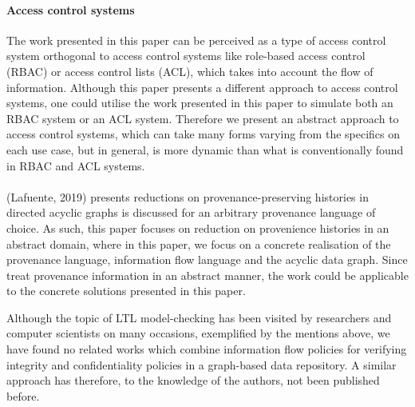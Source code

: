 \paragraph{Access control systems}
The work presented in this paper can be perceived as a type of access control system orthogonal to access control systems like role-based access control (RBAC) or access control lists (ACL), which takes into account the flow of information. Although this paper presents a different approach to access control systems, one could utilise the work presented in this paper to simulate both an RBAC system or an ACL system. Therefore we present an abstract approach to access control systems, which can take many forms varying from the specifics on each use case, but in general, is more dynamic than what is conventionally found in RBAC and ACL systems.

\paragraph{}
(Lafuente, 2019)\cite{lafuente2019framework} presents reductions on provenance-preserving histories in directed acyclic graphs is discussed for an arbitrary provenance language of choice. As such, this paper focuses on reduction on provenience histories in an abstract domain, where in this paper, we focus on a concrete realisation of the provenance language, information flow language and the acyclic data graph. Since \cite{lafuente2019framework} treat provenance information in an abstract manner, the work could be applicable to the concrete solutions presented in this paper.

Although the topic of LTL model-checking has been visited by researchers and computer scientists on many occasions, exemplified by the mentions above, we have found no related works which combine information flow policies for verifying integrity and confidentiality policies in a graph-based data repository. A similar approach has therefore, to the knowledge of the authors, not been published before.
